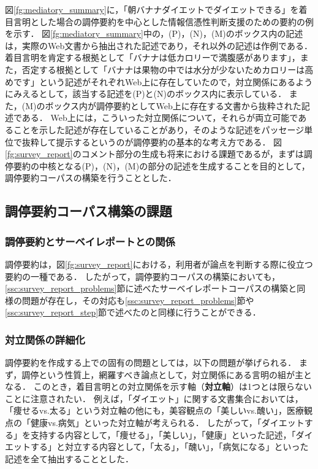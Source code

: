 \documentclass[japanese]{jnlp_1.4}
\begin{document}
図\ref{fg:mediatory_summary}に，「朝バナナダイエットでダイエットできる」を着目言明とした場合の調停要約{を}中心とした情報信憑性判断支援のための要約の例を示す．
{図\ref{fg:mediatory_summary}中の}，(P)，(N)，(M)のボックス内の記述は，実際のWeb文書から抽出された記述であり，それ以外の記述は作例である．
着目言明を肯定する根拠として「バナナは低カロリーで満腹感があります」，また，否定する根拠として「バナナは果物の中では水分が少ないためカロリーは高めです」という記述がそれぞれWeb上に存在していたので，対立関係にあるようにみえるとして，該当する記述を(P)と(N)のボックス内に表示している．
また，(M)のボックス内が調停要約としてWeb上に存在する文書から抜粋された記述である．
Web上には，こういった対立関係について，それらが両立可能であることを示した記述が存在していることがあり，そのような記述をパッセージ単位で抜粋して提示するというのが調停要約の基本的な考え方である．
図\ref{fg:survey_report}のコメント部分の生成も将来における課題であるが，まずは調停要約の中核となる(P)，(N)，(M)の部分の記述を生成することを目的として，調停要約コーパスの構築を行うこととした．


\subsection{調停要約コーパス構築の課題}
\label{ssc:mediatory_summary_problems}

\subsubsection{調停要約とサーベイレポートとの関係}

調停要約は，図\ref{fg:survey_report}における，利用者が{論点}を判断する際に役立つ要約の一種である．
したがって，調停要約コーパスの構築においても，\ref{ssc:survey_report_problems}節に述べたサーベイレポートコーパスの構築と同様の問題が存在し，その対応も\ref{ssc:survey_report_problems}節や\ref{ssc:survey_report_step}節で述べたのと同様に行うことができる．

\subsubsection{対立関係の詳細化}

調停要約を作成する上での固有の問題としては，以下の問題が挙げられる．
まず，調停という性質上，網羅すべき論点として，対立関係にある言明の組が主となる．
このとき，着目言明との対立関係を示す軸（{\bf 対立軸}）は1つとは限らないことに注意されたい．
例えば，「ダイエット」に関する文書集合においては，「痩せるvs.太る」という対立軸の他にも，美容観点の「美しいvs.醜い」，医療観点の「健康vs.病気」といった対立軸が考えられる．
したがって，「ダイエットする」を支持する内容として，「痩せる」，「美しい」，「健康」といった記述，「ダイエットする」と対立する内容として，「太る」，「醜い」，「病気になる」といった記述を全て抽出することとした．
\end{document}
